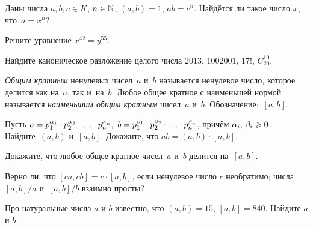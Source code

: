\documentclass[a4paper,12pt]{article}
\begin{document}
Даны числа $a, b, c \in K$, $n\in\mathbb{N}$, $(a,b) = 1$, $ab = c^n$.
Найдётся ли такое число $x$, что~$a = x^n$?

Решите уравнение $x^{42} = y^{55}$.

Найдите каноническое разложение целого числа
$2013$,
$1002001$,
$17!$,
$C_{20}^{10}$.


\emph{Общим кратным} ненулевых чисел~$a$ и~$b$ называется ненулевое число, которое делится как на~$a$, так и~на~$b$. Любое общее кратное с наименьшей нормой называется \emph{наименьшим общим кратным} чисел~$a$ и~$b$. Обозначение:~$[a,b]$.

Пусть $a=p_1^{\alpha_1}\cdot p_2^{\alpha_2}\cdot\ldots\cdot p_n^{\alpha_n},\,\,b=p_1^{\beta_1}\cdot p_2^{\beta_2}\cdot\ldots\cdot p_n^{\beta_n}$, причём $\alpha_i,\,\beta_i\geqslant0$.\\
Найдите~$(a,b)$ и~$[a,b]$.
Докажите, что $ab=(a,b)\cdot[a,b]$.

Докажите, что любое общее кратное чисел~$a$ и~$b$ делится на~$[a,b]$.

Верно ли, что
$[ca,cb]=c\cdot[a,b]$, если ненулевое число $c$ необратимо;
числа $[a,b]/a$ и~$[a,b]/b$ взаимно просты?

Про натуральные числа $a$ и $b$ известно, что $(a,b) = 15$, $[a,b] = 840$. Найдите $a$ и $b$.


\vspace*{-3mm}%
\end{document}
